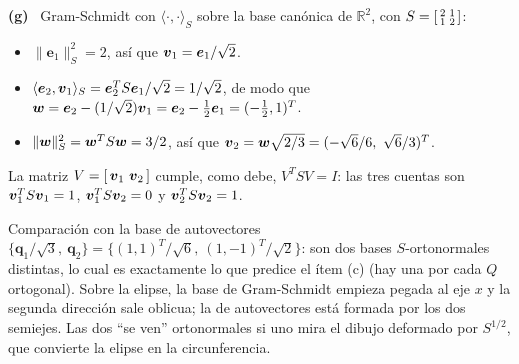 \documentclass[11pt,a4paper]{article}
\newcommand{\bi}[1]{\boldsymbol{#1}}
\newcommand{\R}{\mathbb{R}}
\newcommand{\bq}{\bi{q}}  \newcommand{\bx}{\bi{x}}  \newcommand{\by}{\bi{y}}
\newcommand{\itemsol}[1]{\par\medskip\noindent\textbf{(#1)}\ \ignorespaces}
\begin{document}
\itemsol{g} Gram-Schmidt con $\langle\cdot,\cdot\rangle_S$ sobre la base canónica
de $\R^2$, con $S=\begin{bsmallmatrix}2&1\\1&2\end{bsmallmatrix}$:
\begin{itemize}[itemsep=2pt,topsep=3pt]
\item $\|\bi{e}_1\|_S^2=2$, así que $\bv_1=\bi{e}_1/\sqrt2$.
\item $\langle\bi{e}_2,\bv_1\rangle_S=\bi{e}_2^TS\bi{e}_1/\sqrt2=1/\sqrt2$, de
modo que $\bw=\bi{e}_2-(1/\sqrt2)\bv_1=\bi{e}_2-\tfrac12\bi{e}_1=(-\tfrac12,1)^T$.
\item $\|\bw\|_S^2=\bw^TS\bw=3/2$, así que
$\bv_2=\bw\sqrt{2/3}=(-\sqrt6/6,\ \sqrt6/3)^T$.
\end{itemize}
La matriz $V=[\,\bv_1\ \bv_2\,]$ cumple, como debe, $V^TSV=I$: las tres cuentas
son $\bv_1^TS\bv_1=1$, $\bv_1^TS\bv_2=0$ y $\bv_2^TS\bv_2=1$.

Comparación con la base de autovectores
$\{\bq_1/\sqrt3,\ \bq_2\}=\{(1,1)^T/\sqrt6,\ (1,-1)^T/\sqrt2\}$: son dos bases
$S$-ortonormales distintas, lo cual es exactamente lo que predice el ítem (c)
(hay una por cada $Q$ ortogonal). Sobre la elipse, la base de Gram-Schmidt
empieza pegada al eje $x$ y la segunda dirección sale oblicua; la de autovectores
está formada por los dos semiejes. Las dos ``se ven'' ortonormales si uno mira el
dibujo deformado por $S^{1/2}$, que convierte la elipse en la circunferencia.
\end{document}
